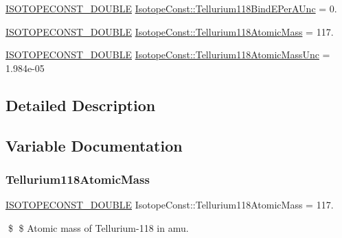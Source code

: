 \begin{DoxyCompactItemize}
\mbox{\hyperlink{group___isotope_const-_macros_ga8f45a7272ce02c0b4c65c44636ed719a}{I\+S\+O\+T\+O\+P\+E\+C\+O\+N\+S\+T\+\_\+\+D\+O\+U\+B\+LE}} \mbox{\hyperlink{group___isotope_const-_tellurium-_te118_gae4b07e03a601e516844cfc096851891b}{Isotope\+Const\+::\+Tellurium118\+Bind\+E\+Per\+A\+Unc}} = 0.
\item 
\mbox{\hyperlink{group___isotope_const-_macros_ga8f45a7272ce02c0b4c65c44636ed719a}{I\+S\+O\+T\+O\+P\+E\+C\+O\+N\+S\+T\+\_\+\+D\+O\+U\+B\+LE}} \mbox{\hyperlink{group___isotope_const-_tellurium-_te118_gacde1e8c7d0de996d5ca18f9d247c09f5}{Isotope\+Const\+::\+Tellurium118\+Atomic\+Mass}} = 117.
\item 
\mbox{\hyperlink{group___isotope_const-_macros_ga8f45a7272ce02c0b4c65c44636ed719a}{I\+S\+O\+T\+O\+P\+E\+C\+O\+N\+S\+T\+\_\+\+D\+O\+U\+B\+LE}} \mbox{\hyperlink{group___isotope_const-_tellurium-_te118_ga0acb7d389e7180183ca5d64f744d0fd8}{Isotope\+Const\+::\+Tellurium118\+Atomic\+Mass\+Unc}} = 1.\+984e-\/05
\end{DoxyCompactItemize}


\subsection{Detailed Description}


\subsection{Variable Documentation}
\mbox{\label{group___isotope_const-_tellurium-_te118_gacde1e8c7d0de996d5ca18f9d247c09f5}} 
\subsubsection{\texorpdfstring{Tellurium118\+Atomic\+Mass}{Tellurium118AtomicMass}}
{\footnotesize\ttfamily \mbox{\hyperlink{group___isotope_const-_macros_ga8f45a7272ce02c0b4c65c44636ed719a}{I\+S\+O\+T\+O\+P\+E\+C\+O\+N\+S\+T\+\_\+\+D\+O\+U\+B\+LE}} Isotope\+Const\+::\+Tellurium118\+Atomic\+Mass = 117.}

\$ \$ Atomic mass of Tellurium-\/118 in amu. \mbox{\label{group___isotope_const-_tellurium-_te118_ga0acb7d389e7180183ca5d64f744d0fd8}} 
